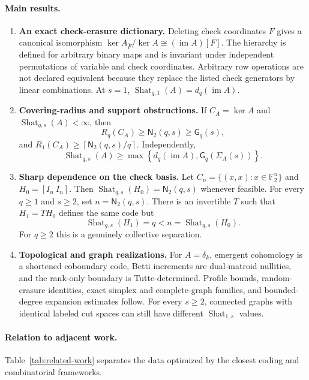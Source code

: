 \documentclass[11pt,letterpaper]{article}
\theoremstyle{plain}
\theoremstyle{definition}
\newcommand{\F}{\mathbb{F}_2}
\newcommand{\im}{\operatorname{im}}
\newcommand{\Shat}{\operatorname{Shat}}
\newcommand{\1}{\mathbf{1}}
\newcommand{\ceil}[1]{\left\lceil#1\right\rceil}
\begin{document}
\paragraph{Main results.}
\begin{enumerate}[label=\textbf{R\arabic*.},leftmargin=*,itemsep=3pt]
\item \textbf{An exact check-erasure dictionary.}
Deleting check coordinates $F$ gives a canonical isomorphism
$\ker A_{\bar F}/\ker A\cong(\im A)[F]$.  The hierarchy is defined for
arbitrary binary maps and is invariant under independent permutations of
variable and check coordinates.  Arbitrary row operations are not declared
equivalent because they replace the listed check generators by linear
combinations.  At $s=1$, $\Shat_{q,1}(A)=d_q(\im A)$.

\item \textbf{Covering-radius and support obstructions.}
If $C_A=\ker A$ and $\Shat_{q,s}(A)<\infty$, then
\[
 R_q(C_A)\ge \mathsf N_2(q,s)\ge \mathsf G_q(s),
\]
and $R_1(C_A)\ge\ceil{\mathsf N_2(q,s)/q}$.  Independently,
\[
 \Shat_{q,s}(A)\ge
 \max\left\{d_q(\im A),\mathsf G_q(\Sigma_A(s))\right\}.
\]

\item \textbf{Sharp dependence on the check basis.}
Let $C_n=\{(x,x):x\in\F^n\}$ and $H_0=[I_n\ I_n]$.  Then
$\Shat_{q,s}(H_0)=\mathsf N_2(q,s)$ whenever feasible.  For every
$q\ge1$ and $s\ge2$, set $n=\mathsf N_2(q,s)$.  There is an invertible
$T$ such that $H_1=TH_0$ defines the same code but
\[
 \Shat_{q,s}(H_1)=q<n=\Shat_{q,s}(H_0).
\]
For $q\ge2$ this is a genuinely collective separation.

\item \textbf{Topological and graph realizations.}
For $A=\delta_k$, emergent cohomology is a shortened coboundary code, Betti
increments are dual-matroid nullities, and the rank-only boundary is
Tutte-determined.  Profile bounds, random-erasure identities, exact simplex
and complete-graph families, and bounded-degree expansion estimates follow.
For every $s\ge2$, connected graphs with identical labeled cut spaces can
still have different $\Shat_{1,s}$ values.
\end{enumerate}

\paragraph{Relation to adjacent work.}
Table~\ref{tab:related-work} separates the data optimized by the closest
coding and combinatorial frameworks.
\end{document}
